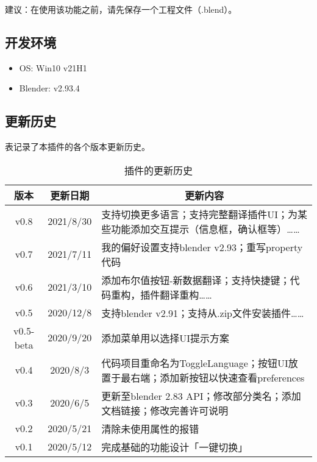 \documentclass{../../PublicResources/DocClass}
\begin{document}
建议：在使用该功能之前，请先保存一个工程文件（.blend）。

\subsection{开发环境}
\begin{itemize}
    \item OS: Win10 v21H1
    \item Blender: v2.93.4
\end{itemize}

\newpage
\subsection{更新历史}
表记录了本插件的各个版本更新历史。
\begin{table}[h!]
    \caption{插件的更新历史}
    \label{更新历史}
    \begin{tabular}{|*{2}{c|}m{305pt}|}
        \hline
        版本      & 更新日期  & \multicolumn{1}{c|}{更新内容}                                                       \\
        \hline
        v0.8      & 2021/8/30 & 支持切换更多语言；支持完整翻译插件UI；为某些功能添加交互提示（信息框，确认框等）……  \\
        \hline
        v0.7      & 2021/7/11 & 我的偏好设置支持blender v2.93；重写property代码                                     \\
        \hline
        v0.6      & 2021/3/10 & 添加布尔值按钮-新数据翻译；支持快捷键；代码重构，插件翻译重构……                     \\
        \hline
        v0.5      & 2020/12/8 & 支持blender v2.91；支持从.zip文件安装插件……                                         \\
        \hline
        v0.5-beta & 2020/9/20 & 添加菜单用以选择UI提示方案                                                          \\
        \hline
        v0.4      & 2020/8/3  & 代码项目重命名为ToggleLanguage；按钮UI放置于最右端；添加新按钮以快速查看preferences \\
        \hline
        v0.3      & 2020/6/5  & 更新至blender 2.83 API；修改部分类名；添加文档链接；修改完善许可说明                \\
        \hline
        v0.2      & 2020/5/21 & 清除未使用属性的报错                                                                \\
        \hline
        v0.1      & 2020/5/12 & 完成基础的功能设计「一键切换」                                                      \\
        \hline
    \end{tabular}
\end{table}
\end{document}
